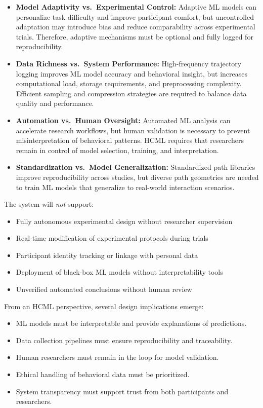 \documentclass[sigconf]{acmart}
\begin{document}
\begin{itemize}

\item \textbf{Model Adaptivity vs.\ Experimental Control:}  
Adaptive ML models can personalize task difficulty and improve participant comfort, but uncontrolled adaptation may introduce bias and reduce comparability across experimental trials. Therefore, adaptive mechanisms must be optional and fully logged for reproducibility.

\item \textbf{Data Richness vs.\ System Performance:}  
High-frequency trajectory logging improves ML model accuracy and behavioral insight, but increases computational load, storage requirements, and preprocessing complexity. Efficient sampling and compression strategies are required to balance data quality and performance.

\item \textbf{Automation vs.\ Human Oversight:}  
Automated ML analysis can accelerate research workflows, but human validation is necessary to prevent misinterpretation of behavioral patterns. HCML requires that researchers remain in control of model selection, training, and interpretation.

\item \textbf{Standardization vs.\ Model Generalization:}  
Standardized path libraries improve reproducibility across studies, but diverse path geometries are needed to train ML models that generalize to real-world interaction scenarios.

\end{itemize}

The system will \emph{not} support:

\begin{itemize}
\item Fully autonomous experimental design without researcher supervision
\item Real-time modification of experimental protocols during trials
\item Participant identity tracking or linkage with personal data
\item Deployment of black-box ML models without interpretability tools
\item Unverified automated conclusions without human review
\end{itemize}

From an HCML perspective, several design implications emerge:

\begin{itemize}
\item ML models must be interpretable and provide explanations of predictions.
\item Data collection pipelines must ensure reproducibility and traceability.
\item Human researchers must remain in the loop for model validation.
\item Ethical handling of behavioral data must be prioritized.
\item System transparency must support trust from both participants and researchers.
\end{itemize}
\end{document}
